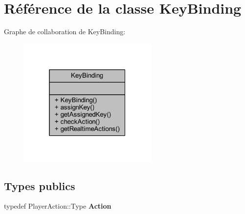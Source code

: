 \hypertarget{class_key_binding}{}\section{Référence de la classe Key\+Binding}
\label{class_key_binding}


Graphe de collaboration de Key\+Binding\+:\nopagebreak
\begin{figure}[H]
\begin{center}
\leavevmode
\includegraphics[width=196pt]{class_key_binding__coll__graph}
\end{center}
\end{figure}
\subsection*{Types publics}
\begin{DoxyCompactItemize}
\item 
\hypertarget{class_key_binding_aa7d3e2787c3e4d64d2cc6c9403681db0}{}\label{class_key_binding_aa7d3e2787c3e4d64d2cc6c9403681db0} 
typedef Player\+Action\+::\+Type {\bfseries Action}
\end{DoxyCompactItemize}
